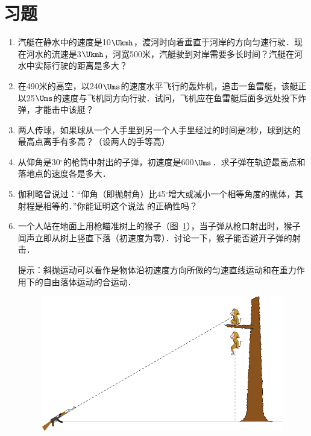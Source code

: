 \section*{习题}

\begin{enumerate}
	\item 汽艇在静水中的速度是10$\Ukmh$，渡河时向着垂直于河岸的方向匀速行驶．现在河水的流速是3$\Ukmh$，河宽500米，汽艇驶到对岸需要多长时间？汽艇在河水中实际行驶的距离是多大？
\item 在490米的高空，以240$\Ums$的速度水平飞行的轰炸机，追击一鱼雷艇，该艇正以25$\Ums$的速度与飞机同方向行驶．试问，飞机应在鱼雷艇后面多远处投下炸弹，才能击中该艇？
\item 两人传球，如果球从一个人手里到另一个人手里经过的时间是2秒，球到达的最高点离手有多高？（设两人的手等高）
\item 从仰角是30$^\circ$的枪筒中射出的子弹，初速度是600$\Ums$．求子弹在轨迹最高点和落地点的速度各是多大．
\item 伽利略曾说过：“仰角（即抛射角）比45$^\circ$增大或减小一个相等角度的抛体，其射程是相等的．”你能证明这个说法
的正确性吗？
\item 一个人站在地面上用枪瞄准树上的猴子（图~\ref{fig_A_4-32}），当子弹从枪口射出时，猴子闻声立即从树上竖直下落（初速度为零）．讨论一下，猴子能否避开子弹的射击．

提示：斜抛运动可以看作是物体沿初速度方向所做的匀速直线运动和在重力作用下的自由落体运动的合运动．

\begin{figure}[htbp]
    \centering
    \includegraphics{fig/A/4-32.pdf}
    \caption{}\label{fig_A_4-32}
\end{figure}


\end{enumerate}
